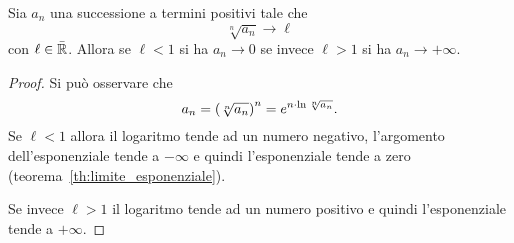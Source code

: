 \begin{theorem}
\label{th:criterio_radice}%
\mymark{***}%
%
%
Sia $a_n$ una successione a termini positivi tale che
\[
  \sqrt[n]{a_n} \to \ell
\]
con $\ell \in \bar {\mathbb R}$.
Allora se $\ell<1$ si ha $a_n \to 0$ se invece $\ell > 1$ si ha $a_n \to +\infty$.
\end{theorem}
%
\begin{comment}
\begin{proof}
\mymark{**}
Consideriamo prima il caso $\ell < 1$.
Se $\lim \sqrt[n]{a_n} = \ell$ significa che per ogni $\eps>0$ la successione
$\sqrt[n]{a_n}$ risulta definitivamente minore di $\ell +\eps$.
Scegliendo opportunamente $\eps$ (ad esempio $\eps = (1-\ell)/2$) si potrà
avere $q = \ell+\eps < 1$. Dunque avremo definitivamente $\sqrt[n]{a_n}< q$
ovvero $a_n < q^n$. Per ipotesi $a_n\ge 0$
e quindi, tolto un numero finito di termini, si ottiene $0 \le a_n < q^n \to 0$
da cui $a_n \to 0$ (in quanto l'aver tolto un numero finito di termini non
cambia né il carattere né il limite della successione).

Se $\ell>1$ si potrà procedere in maniera analoga. Esisterà $q$ con $1 < q < \ell$ tale che definitivamente $\sqrt[n]{a_n} > q$ da cui $a_n > q^n \to +\infty$.
\end{proof}
\end{comment}

\begin{proof}
  Si può osservare che
  \[
    a_n = {\left( \sqrt[n]{a_n} \right)}^n
     = e^{n \cdot \ln \sqrt[n]{a_n}}.
  \]
  Se $\ell <1$ allora il logaritmo tende ad un numero negativo,
  l'argomento dell'esponenziale tende a $-\infty$ e quindi l'esponenziale tende a zero (teorema~\ref{th:limite_esponenziale}).

  Se invece $\ell>1$ il logaritmo tende ad un numero positivo e quindi l'esponenziale tende a $+\infty$.
\end{proof}

